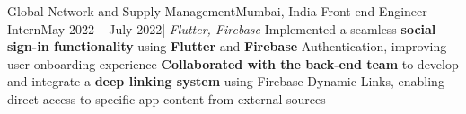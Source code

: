     \resumeSubheading
      {Global Network and Supply Management}{Mumbai, India}
      {Front-end Engineer Intern}{May 2022 -- July 2022}{| \textit{Flutter, Firebase}}
      \resumeItemListStart
        {Implemented a seamless \textbf{social sign-in functionality} using \textbf{Flutter} and \textbf{Firebase} Authentication, improving user onboarding experience}
        {\textbf{Collaborated with the back-end team} to develop and integrate a \textbf{deep linking system} using Firebase Dynamic Links, enabling direct access to specific app content from external sources}
      \resumeItemListEnd